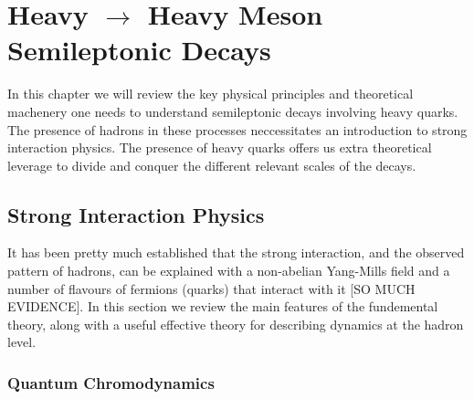\chapter{Heavy $\to$ Heavy Meson Semileptonic Decays}
\label{chap:semileptonic}

In this chapter we will review the key physical principles and theoretical machenery one needs to understand semileptonic decays involving heavy quarks. The presence of hadrons in these processes neccessitates an introduction to strong interaction physics. The presence of heavy quarks offers us extra theoretical leverage to divide and conquer the different relevant scales of the decays.

\section{Strong Interaction Physics}
\label{sec:stronginteractions}

It has been pretty much established that the strong interaction, and the observed pattern of hadrons, can be explained with a non-abelian Yang-Mills field and a number of flavours of fermions (quarks) that interact with it [SO MUCH EVIDENCE]. In this section we review the main features of the fundemental theory, along with a useful effective theory for describing dynamics at the hadron level. 

\subsection{Quantum Chromodynamics}

{}


